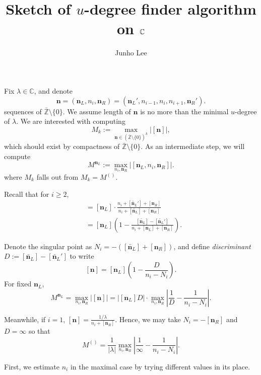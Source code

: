 \documentclass{article}
\title{Sketch of $u$-degree finder algorithm on $\bC$}
\author{Junho Lee}
\theoremstyle{definition}
\theoremstyle{plain}
\theoremstyle{remark}
\numberwithin{equation}{section}
\newcommand{\bZ}{\mathbb{Z}}
\newcommand{\bC}{\mathbb{C}}
\newcommand{\abs}[1]{\left| {#1} \right|}
\def\ns{{\mathbf{n}}}
\def\nsL{{\mathbf{n}_L}}
\def\nsR{{\mathbf{n}_R}}
\begin{document}
\maketitle

Fix $\lambda \in \bC$, and denote
\[
  \ns = (\nsL, n_i, \nsR) = (\nsL', n_{i-1}, n_i, n_{i+1}, \nsR').
\]
sequences of $\bar{\bZ} \setminus \{0\}$.
We assume length of $\ns$ is no more than the minimal $u$-degree of $\lambda$.
We are interested with computing
\[
  M_k := \max_{\ns \in (\bar{\bZ} \setminus \{0\})^k} \abs{[\ns]},
\]
which should exist by compactness of $\bar{\bZ} \setminus \{0\}$.
As an intermediate step, we will compute
\[ M^{\nsL} := \max_{n_i, \nsR} \abs{[\nsL, n_i, \nsR]}. \]
where $M_k$ falls out from $M_k = M^{()}$.

Recall that for $i \geq 2$,
\begin{align*}
  [\ns] & = [\nsL] \cdot \frac{n_i + [\overleftarrow{\nsL}'] + [\nsR]}{n_i + [\overleftarrow{\nsL}] + [\nsR]} \\
  & = [\nsL] \left( 1 - \frac{[\overleftarrow{\nsL}] - [\overleftarrow{\nsL}']}{n_i + [\nsL] + [\nsR]} \right).
\end{align*}

Denote the singular point as $N_i = - ([\overleftarrow{\nsL}] + [\nsR])$,
and define \textit{discriminant} $D := [\overleftarrow{\nsL}] - [\overleftarrow{\nsL}']$ to write
\[
  [\ns] = [\nsL] \left( 1 - \frac{D}{n_i - N_i} \right).
\]
For fixed $\nsL$,
\[
  M^{\nsL} = \max_{n_i, \nsR} \abs{[\ns]} = \abs{[\nsL] D} \cdot \max_{n_i, \nsR} \left| \frac{1}{D} - \frac{1}{n_i - N_i} \right|.
\]

Meanwhile, if $i = 1$, $[\ns] = \frac{1 / \lambda}{n_i + [\nsR]}$.
Hence, we may take $N_i = - [\nsR]$ and $D = \infty$ so that
\[
  M^{()} = \frac{1}{\abs{\lambda}} \max_{n_i, \nsR} \abs{\frac{1}{\infty} - \frac{1}{n_i - N_i}}.
\]

First, we estimate $n_i$ in the maximal case by trying different values in its place.
\end{document}
